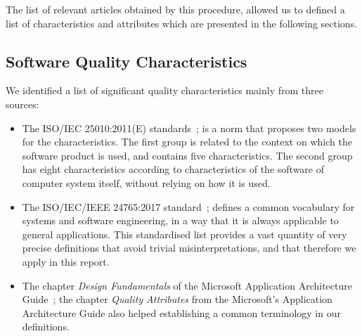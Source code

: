 
The list of relevant articles obtained by this procedure, allowed us to defined a list of characteristics and attributes which are presented in the following sections.

\subsection{Software Quality Characteristics}
\label{subsect:sqchar}

We identified a list of significant quality characteristics mainly from three sources:

\begin{itemize}
    \item The ISO/IEC 25010:2011(E) standards~\cite{iso_25010_2011_2017}; is a norm that proposes two models for the characteristics. The first group is related to the context on which the software product is used, and contains five characteristics. The second group has eight characteristics according to characteristics of the software of computer system itself, without relying on how it is used.

    \item The ISO/IEC/IEEE 24765:2017 standard~\cite{iso_iec_24765_2017}; defines a common vocabulary for systems and software engineering, in a way that it is always applicable to general applications. This standardised list provides a vast quantity of very precise definitions that avoid trivial misinterpretations, and that therefore we apply in this report.

    \item The chapter \textit{Design Fundamentals} of the Microsoft Application Architecture Guide~\cite{microsoft_2010}; the chapter \textit{Quality Attributes} from the Microsoft's Application Architecture Guide also helped establishing a common terminology in our definitions.

\end{itemize}

